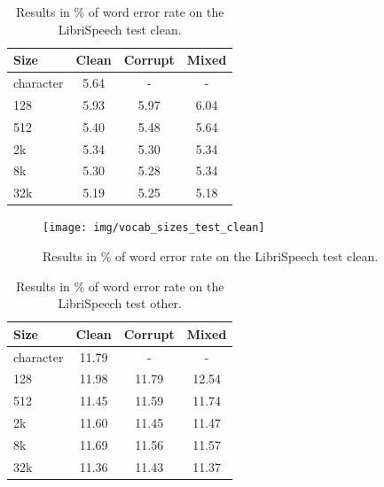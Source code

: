 \begin{table}[p]
	\centering
	\begin{tabular}{l|ccc}
		\bf Size & \bf Clean & \bf Corrupt & \bf Mixed \\
		\hline
		
		character    &    5.64    &    -    &    - \\
		128    &    5.93    &    5.97    &    6.04 \\
		512    &    5.40    &    5.48    &    5.64 \\
		2k    &    5.34    &    5.30    &    5.34 \\
		8k    &    5.30    &    5.28    &    5.34 \\
		32k    &    5.19    &    5.25    &    5.18 \\
		
	\end{tabular}
	
	\caption{Results in \% of word error rate on the LibriSpeech test clean.}
	\label{tab:results_vocabularies_libri_clean}
\end{table}

\begin{figure}[p]
	\centering
	\texttt{[image: img/vocab\_sizes\_test\_clean]}
	\caption{Results in \% of word error rate on the LibriSpeech test clean.}
	\label{fig:vocab_sizes_test_clean}
\end{figure}

\begin{table}[p]
	\centering
	\begin{tabular}{l|ccc}
		\bf Size & \bf Clean & \bf Corrupt & \bf Mixed \\
		\hline
		character    &    11.79    &    -    &    - \\
		128    &    11.98    &    11.79    &    12.54\\
		512    &    11.45    &    11.59    &    11.74\\
		2k    &    11.60    &    11.45    &    11.47\\
		8k    &    11.69    &    11.56    &    11.57\\
		32k    &    11.36    &    11.43    &    11.37\\
		
	\end{tabular}
	
	\caption{Results in \% of word error rate on the LibriSpeech test other.}
	\label{tab:results_vocabularies_libri_other}
\end{table}

